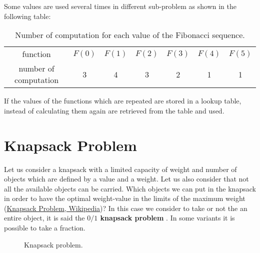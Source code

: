 Some values are used several times in different sub-problem as shown in the following table:
\begin{table}[H]
	\centering
	\begin{tabular}{c c c c c c c}
	function & $F(0)$ & $F(1)$ & $F(2)$ & $F(3)$ & $F(4)$ & $F(5)$ \\
	number of computation & 3 & 4 & 3 & 2 & 1 & 1
	\end{tabular}
	\caption[Number of computation for each value of the Fibonacci sequence.]{Number of computation for each value of the Fibonacci sequence.}
\end{table}
If the values of the functions which are repeated are stored in a lookup table, instead of calculating them again are retrieved from the table and used.

\section{Knapsack Problem}
Let us consider a knapsack with a limited capacity of weight and number of objects which are defined by a value and a weight. Let us also consider that not all the available objects can be carried. Which objects we can put in the knapsack in order to have the optimal weight-value in the limits of the maximum weight \cite{wikiknapsackproblem}(\href{https://en.wikipedia.org/wiki/Knapsack_problem}{Knapsack Problem, Wikipedia})? In this case we consider to take or not the an entire object, it is said the \textbf{\(0/1\) knapsack problem} . In some variants it is possible to take a fraction.

\begin{figure}[H]
\centering
{}
\caption[Knapsack problem.]{Knapsack problem.}
\end{figure}

